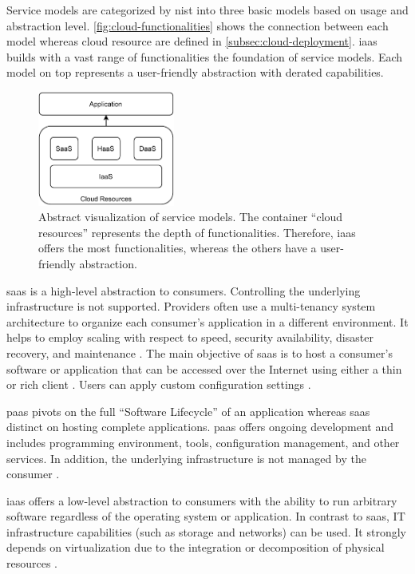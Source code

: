 Service models are categorized by \ac{nist} into three basic models based on usage and abstraction level.
\autoref{fig:cloud-functionalities} shows the connection between each model whereas cloud resource are defined in \autoref{subsec:cloud-deployment}.
\ac*{iaas} builds with a vast range of functionalities the foundation of service models.
Each model on top represents a user-friendly abstraction with derated capabilities.

\begin{figure}
    \centering
    \includegraphics[width=0.4\textwidth]{figures/cloud-service-models.pdf}
    \caption[Abstract visualization of service models]{
        Abstract visualization of service models.
        The container \enquote{cloud resources} represents the depth of functionalities.
        Therefore, \ac{iaas} offers the most functionalities, whereas the others have a user-friendly abstraction.
    }
    \label{fig:cloud-functionalities}
\end{figure}

\ac{saas} is a high-level abstraction to consumers.
Controlling the underlying infrastructure is not supported.
Providers often use a multi-tenancy system architecture to organize each consumer's application in a different environment.
It helps to employ scaling with respect to speed, security availability, disaster recovery, and maintenance \cite{Mell2011}.
The main objective of \ac{saas} is to host a consumer's software or application that can be accessed over the Internet using either a thin or rich client \cite{Dillon2010}.
Users can apply custom configuration settings \cite{Mell2011}.

\ac{paas} pivots on the full \enquote{Software Lifecycle} of an application whereas \ac{saas} distinct on hosting complete applications.
\ac{paas} offers ongoing development and includes programming environment, tools, configuration management, and other services.
In addition, the underlying infrastructure is not managed by the consumer \cite{Mell2011}.

\ac{iaas} offers a low-level abstraction to consumers with the ability to run arbitrary software regardless of the operating system or application.
In contrast to \ac{saas}, IT infrastructure capabilities (such as storage and networks) can be used.
It strongly depends on virtualization due to the integration or decomposition of physical resources \cite{Mell2011}.

